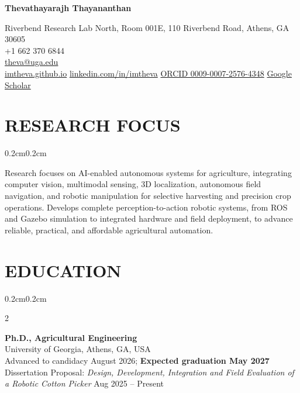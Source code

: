 \documentclass[10pt, letterpaper]{article}
\newenvironment{onecolentry}{%
    \begin{adjustwidth}{0.2cm}{0.2cm}
}{\end{adjustwidth}}
\newenvironment{twocolentry}[2][]{%
    \onecolentry
    \def\secondColumn{#2}
    \setcolumnwidth{\fill, 4.2cm}
    \begin{paracol}{2}
}{%
    \switchcolumn \raggedleft \secondColumn
    \end{paracol}
    \endonecolentry
}
\begin{document}
\begin{center}
    {\fontsize{16pt}{18pt}\selectfont\bfseries Thevathayarajh Thayananthan}

    \vspace{0.18cm}

    Riverbend Research Lab North, Room 001E, 110 Riverbend Road, Athens, GA 30605 \\
    +1 662 370 6844 \\
    \href{mailto:theva@uga.edu}{theva@uga.edu} \\
    \href{https://imtheva.github.io}{imtheva.github.io} \textbar{}
    \href{https://www.linkedin.com/in/imtheva}{linkedin.com/in/imtheva} \textbar{}
    \href{https://orcid.org/0009-0007-2576-4348}{ORCID 0009-0007-2576-4348} \textbar{}
    \href{https://scholar.google.com/citations?user=MpKhKEUAAAAJ}{Google Scholar}
\end{center}

\vspace{0.25cm}

\section{RESEARCH FOCUS}
\vspace{0.06cm}
\begin{onecolentry}
    Research focuses on AI-enabled autonomous systems for agriculture, integrating
    computer vision, multimodal sensing, 3D localization, autonomous field navigation,
    and robotic manipulation for selective harvesting and precision crop operations.
    Develops complete perception-to-action robotic systems, from ROS and Gazebo
    simulation to integrated hardware and field deployment, to advance reliable,
    practical, and affordable agricultural automation.
\end{onecolentry}
\vspace{0.18cm}

\section{EDUCATION}
\vspace{0.08cm}

\begin{twocolentry}{Aug 2025 -- Present}
    \textbf{Ph.D., Agricultural Engineering} \\
    University of Georgia, Athens, GA, USA \\
    Advanced to candidacy August 2026; \textbf{Expected graduation May 2027} \\
    Dissertation Proposal: \emph{Design, Development, Integration and Field Evaluation of a
    Robotic Cotton Picker}
    \vspace{0.12cm}
\end{twocolentry}
\end{document}
